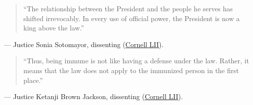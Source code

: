 \documentclass[12pt]{article}
\begin{document}
\begin{quote}
``The relationship between the President and the people he serves has shifted irrevocably. In every use of official power, the President is now a king above the law.''
\end{quote}
\noindent --- Justice Sonia Sotomayor, dissenting (\href{https://www.law.cornell.edu/supremecourt/text/23-939}{Cornell LII}).

\begin{quote}
``Thus, being immune is not like having a defense under the law. Rather, it means that the law does not apply to the immunized person in the first place.''
\end{quote}
\noindent --- Justice Ketanji Brown Jackson, dissenting (\href{https://www.law.cornell.edu/supremecourt/text/23-939}{Cornell LII}).
\end{document}
